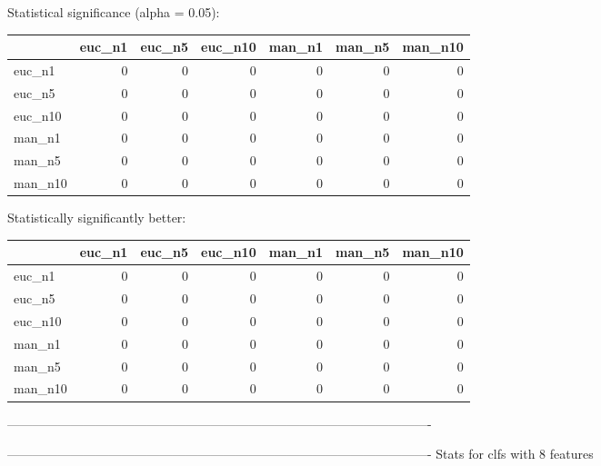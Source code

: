 Statistical significance (alpha = 0.05):
 \begin{tabular}{lrrrrrr}
\hline
         &   euc\_n1 &   euc\_n5 &   euc\_n10 &   man\_n1 &   man\_n5 &   man\_n10 \\
\hline
 euc\_n1  &        0 &        0 &         0 &        0 &        0 &         0 \\
 euc\_n5  &        0 &        0 &         0 &        0 &        0 &         0 \\
 euc\_n10 &        0 &        0 &         0 &        0 &        0 &         0 \\
 man\_n1  &        0 &        0 &         0 &        0 &        0 &         0 \\
 man\_n5  &        0 &        0 &         0 &        0 &        0 &         0 \\
 man\_n10 &        0 &        0 &         0 &        0 &        0 &         0 \\
\hline
\end{tabular} 

Statistically significantly better:
 \begin{tabular}{lrrrrrr}
\hline
         &   euc\_n1 &   euc\_n5 &   euc\_n10 &   man\_n1 &   man\_n5 &   man\_n10 \\
\hline
 euc\_n1  &        0 &        0 &         0 &        0 &        0 &         0 \\
 euc\_n5  &        0 &        0 &         0 &        0 &        0 &         0 \\
 euc\_n10 &        0 &        0 &         0 &        0 &        0 &         0 \\
 man\_n1  &        0 &        0 &         0 &        0 &        0 &         0 \\
 man\_n5  &        0 &        0 &         0 &        0 &        0 &         0 \\
 man\_n10 &        0 &        0 &         0 &        0 &        0 &         0 \\
\hline
\end{tabular} 

----------------------------------------------------------------------------------------------------



----------------------------------------------------------------------------------------------------
Stats for clfs with 8 features


